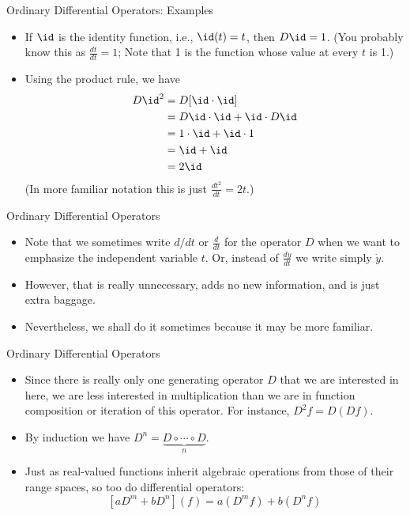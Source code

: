 \begin{frame}
Ordinary Differential Operators: Examples
 \begin{itemize}
  \item If $\id$ is the identity function, i.e., $\id(t)=t$, then
    $D\id=1$. (You probably know this as $\frac{dt}{dt}=1$; Note that 1 is the function whose value at every $t$ is 1.)
  \item Using the product rule, we have
  \begin{align*}
    D\id^2 &= D[\id \cdot \id]\\
           &= D\id \cdot \id + \id \cdot D\id\\
           &= 1 \cdot \id + \id \cdot 1\\
           &= \id + \id\\
           &= 2\id
  \end{align*}
(In more familiar notation this is just $\frac{dt^2}{dt}=2t$.)
 \end{itemize}
\end{frame}
\begin{frame}
Ordinary Differential Operators
 \begin{itemize}
 \item Note that we sometimes write $d/dt$ or $\frac{d}{dt}$ for
 the operator $D$ when we want to emphasize the independent
 variable $t$.  Or, instead of $\frac{dy}{dt}$ we write simply $\dot{y}$.
 \item However, that is really unnecessary, adds no new information, and is just extra
 baggage.
 \item Nevertheless, we shall do it sometimes because it may be more familiar.
\end{itemize}
\end{frame}
\begin{frame}
Ordinary Differential Operators
 \begin{itemize}
 \item Since there is really only one generating operator $D$ that we are interested in here,
 we are less interested in multiplication than we are in function
 composition or iteration of this operator. For instance,
 $D^2f=D(Df)$.
 \item By induction we have $D^n=\underbrace{D\circ\cdots \circ D}_n$.
 \item Just as real-valued functions inherit algebraic operations from those of their range
 spaces, so too do differential operators:
 \[\left[aD^m+bD^n\right](f)=a(D^mf)+b(D^nf)\]
\end{itemize}
\end{frame}
